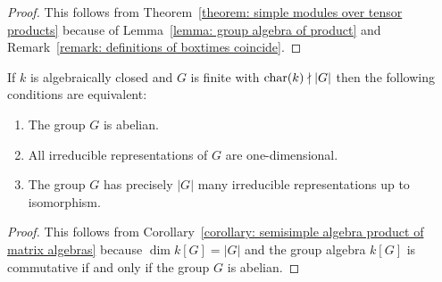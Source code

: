\begin{proof}
  This follows from Theorem~\ref{theorem: simple modules over tensor products} because of Lemma~\ref{lemma: group algebra of product} and Remark~\ref{remark: definitions of boxtimes coincide}.
\end{proof}


\begin{lemma}
  \label{lemma: every irrep is onedimen iff abelian iff number of irrep}
  If $k$ is algebraically closed and $G$ is finite with $\operatorname{char}(k) \nmid |G|$ then the following conditions are equivalent:
  \begin{enumerate}
    \item
      The group $G$ is abelian.
    \item
      All irreducible representations of $G$ are one-dimensional.
    \item
      The group $G$ has precisely $|G|$ many irreducible representations up to isomorphism.
  \end{enumerate}
\end{lemma}


\begin{proof}
  This follows from Corollary~\ref{corollary: semisimple algebra product of matrix algebras} because $\dim k[G] = |G|$ and the group algebra $k[G]$ is commutative if and only if the group $G$ is abelian.
\end{proof}




